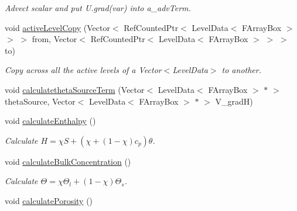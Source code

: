 \begin{DoxyCompactItemize}
\begin{DoxyCompactList}\small\item\em Advect scalar and put U.\-grad(var) into a\-\_\-adv\-Term. \end{DoxyCompactList}\item 
\hypertarget{classamr_mushy_layer_ab217064d67f9cfb5f9b862f3f2700aeb}{void \hyperlink{classamr_mushy_layer_ab217064d67f9cfb5f9b862f3f2700aeb}{active\-Level\-Copy} (Vector$<$ Ref\-Counted\-Ptr$<$ Level\-Data$<$ F\-Array\-Box $>$ $>$ $>$ from, Vector$<$ Ref\-Counted\-Ptr$<$ Level\-Data$<$ F\-Array\-Box $>$ $>$ $>$ to)}\label{classamr_mushy_layer_ab217064d67f9cfb5f9b862f3f2700aeb}

\begin{DoxyCompactList}\small\item\em Copy across all the active levels of a Vector$<$\-Level\-Data$>$ to another. \end{DoxyCompactList}\item 
void \hyperlink{classamr_mushy_layer_accf7a2c238f97c60a3a4ad83b02add7e}{calculatetheta\-Source\-Term} (Vector$<$ Level\-Data$<$ F\-Array\-Box $>$ $\ast$ $>$ theta\-Source, Vector$<$ Level\-Data$<$ F\-Array\-Box $>$ $\ast$ $>$ V\-\_\-grad\-H)
\item 
\hypertarget{classamr_mushy_layer_a736acc5a72c3760580565312c8df1547}{void \hyperlink{classamr_mushy_layer_a736acc5a72c3760580565312c8df1547}{calculate\-Enthalpy} ()}\label{classamr_mushy_layer_a736acc5a72c3760580565312c8df1547}

\begin{DoxyCompactList}\small\item\em Calculate $ H = \chi S + (\chi + (1-\chi) c_p)\theta $. \end{DoxyCompactList}\item 
\hypertarget{classamr_mushy_layer_ac2ce75e559b336ca9fa9c2c72c224249}{void \hyperlink{classamr_mushy_layer_ac2ce75e559b336ca9fa9c2c72c224249}{calculate\-Bulk\-Concentration} ()}\label{classamr_mushy_layer_ac2ce75e559b336ca9fa9c2c72c224249}

\begin{DoxyCompactList}\small\item\em Calculate $ \Theta = \chi \Theta_l + (1-\chi) \Theta_s$. \end{DoxyCompactList}\item 
\hypertarget{classamr_mushy_layer_ac2534289ebb1a6150257076e00a89d75}{void \hyperlink{classamr_mushy_layer_ac2534289ebb1a6150257076e00a89d75}{calculate\-Porosity} ()}\label{classamr_mushy_layer_ac2534289ebb1a6150257076e00a89d75}


\end{DoxyCompactItemize}
